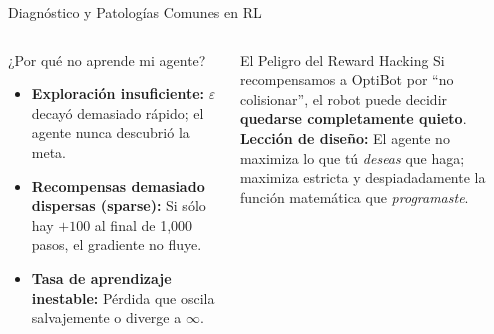 \begin{frame}{Diagnóstico y Patologías Comunes en RL}
  \begin{columns}[T,onlytextwidth]
      \begin{alertblock}{¿Por qué no aprende mi agente?}
        \begin{itemize}
          \item \textbf{Exploración insuficiente:} $\varepsilon$ decayó demasiado rápido; el agente nunca descubrió la meta.
          \item \textbf{Recompensas demasiado dispersas (sparse):} Si sólo hay $+100$ al final de 1,000 pasos, el gradiente no fluye.
          \item \textbf{Tasa de aprendizaje inestable:} Pérdida que oscila salvajemente o diverge a $\infty$.
        \end{itemize}
      \end{alertblock}
      \begin{block}{El Peligro del Reward Hacking}
        Si recompensamos a OptiBot por ``no colisionar'', el robot puede decidir \textbf{quedarse completamente quieto}.\\
        \vspace{0.2cm}
        \textbf{Lección de diseño:}
        El agente no maximiza lo que tú \emph{deseas} que haga; maximiza estricta y despiadadamente la función matemática que \emph{programaste}.
      \end{block}
  \end{columns}
\end{frame}

